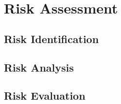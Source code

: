 \chapter{Risk Assessment}


\section{Risk Identification}

\section{Risk Analysis}

\section{Risk Evaluation}

